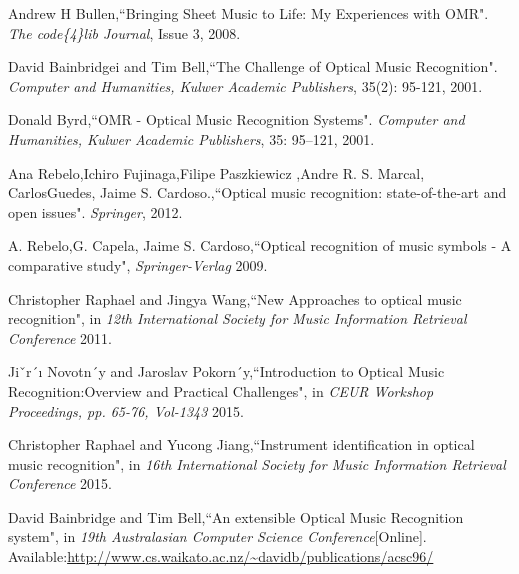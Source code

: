\documentclass[journal]{IEEEtran}
\begin{document}
%
%
%
\begin{thebibliography}{1}
  
Andrew H Bullen,``Bringing Sheet Music to Life: My Experiences with OMR". \emph{The code\{4\}lib Journal}, Issue 3, 2008.

David Bainbridgei and Tim Bell,``The Challenge of Optical Music Recognition". \emph{Computer and Humanities, Kulwer Academic Publishers}, 35(2): 95-121, 2001.

Donald Byrd,``OMR - Optical Music Recognition Systems". \emph{Computer and Humanities, Kulwer Academic Publishers}, 35: 95–121, 2001.

Ana Rebelo,Ichiro Fujinaga,Filipe Paszkiewicz ,Andre R. S. Marcal, CarlosGuedes, Jaime S. Cardoso.,``Optical music recognition: state-of-the-art and open issues". \emph{Springer}, 2012.

A. Rebelo,G. Capela, Jaime S. Cardoso,``Optical recognition of music symbols - A comparative study", \emph{Springer-Verlag} 2009.

Christopher Raphael and Jingya Wang,``New Approaches to optical music recognition", in \emph{12th International Society for Music Information Retrieval Conference} 2011.

Jiˇr´ı Novotn´y and Jaroslav Pokorn´y,``Introduction to Optical Music Recognition:Overview and Practical Challenges", in \emph{CEUR Workshop Proceedings, pp. 65-76, Vol-1343 } 2015.

Christopher Raphael and Yucong Jiang,``Instrument identification in optical music recognition", in \emph{16th International Society for Music Information Retrieval Conference} 2015.

David Bainbridge and Tim Bell,``An extensible Optical Music Recognition system", in \emph{19th Australasian Computer Science Conference}[Online]. Available:\url{http://www.cs.waikato.ac.nz/~davidb/publications/acsc96/}


\end{thebibliography}
\end{document}
